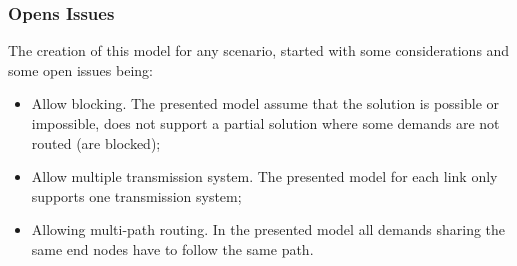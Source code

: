 \vspace{13pt}

\subsubsection{Opens Issues}

The creation of this model for any scenario, started with some considerations and some open issues being:

\begin{itemize}
  \item Allow blocking.
  \subitem The presented model assume that the solution is possible or impossible, does not support a partial solution where some demands are not routed (are blocked);
  \item Allow multiple transmission system.
  \subitem The presented model for each link only supports one transmission system;
  \item Allowing multi-path routing.
  \subitem In the presented model all demands sharing the same end nodes have to follow the same path.
\end{itemize} 
